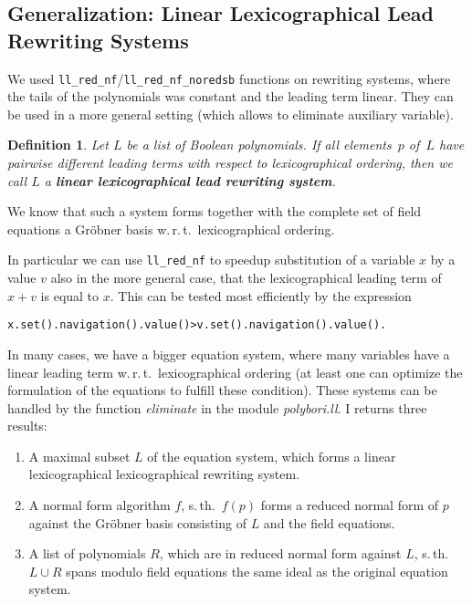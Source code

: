 \documentclass[]{article}
\newcommand{\Groebner}{Gröbner\xspace}
\newcommand{\functionname}[1]{\textit{#1}\xspace}
\newcounter{thm}
\newtheorem{definition}[thm]{Definition}
\begin{document}
\subsection{Generalization: Linear Lexicographical Lead Rewriting Systems}

We used \verb|ll_red_nf|/\verb|ll_red_nf_noredsb| functions on rewriting systems, where the tails of the polynomials was constant and the leading term linear.
They can be used in a more general setting (which allows to eliminate auxiliary variable).
\begin{definition}
Let $L$ be a list of Boolean polynomials.
If all elements~$p$ of~$L$ have pairwise different leading terms with respect to lexicographical ordering,
then we call $L$ a \textbf{linear lexicographical lead rewriting system}.
\end{definition}
We know that such a system forms together with the complete set of field
equations a \Groebner basis w.\,r.\,t.\ lexicographical ordering.

In particular we can use \verb|ll_red_nf| to speedup substitution of a variable $x$ by a value $v$ also in the more general case, that the lexicographical leading term of $x+v$ is equal to $x$.
This can be tested most efficiently by the expression
\begin{verbatim}
x.set().navigation().value()>v.set().navigation().value().
\end{verbatim}

In many cases, we have a bigger equation system, where many variables have a linear leading term w.\,r.\,t.\ lexicographical ordering (at least one can optimize the formulation of the equations to fulfill these condition).
%
These systems can be handled by the function \functionname{eliminate} in the module \functionname{polybori.ll}.
I returns three results:
\begin{enumerate}
    \item A maximal subset $L$ of the equation system, which forms a linear lexicographical lexicographical rewriting system.
    \item A normal form algorithm $f$, s.\,th.\ $f(p)$ forms a reduced normal form of $p$ against the \Groebner basis consisting of $L$ and the field equations.
    \item A list of polynomials $R$, which are in reduced normal form against $L$, s.\,th.\ $L\cup R$ spans modulo field equations the same ideal as the original equation system.
\end{enumerate}
\end{document}
